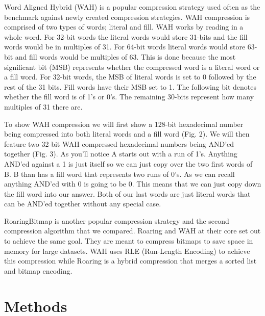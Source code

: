\documentclass{article}
\begin{document}

Word Aligned Hybrid (WAH) is a popular compression strategy used often as the benchmark against newly created compression strategies. WAH compression is comprised of two types of words; literal and fill. WAH works by reading in a whole word. For 32-bit words the literal words would store 31-bits and the fill words would be in multiples of 31. For 64-bit words literal words would store 63-bit and fill words would be multiples of 63. This is done because the most significant bit (MSB) represents whether the compressed word is a literal word or a fill word. For 32-bit words, the MSB of literal words is set to 0 followed by the rest of the 31 bits. Fill words have their MSB set to 1. The following bit denotes whether the fill word is of 1’s or 0’s. The remaining 30-bits represent how many multiples of 31 there are. \par

To show WAH compression we will first show a 128-bit hexadecimal number being compressed into both literal words and a fill word (Fig. 2). We will then feature two 32-bit WAH compressed hexadecimal numbers being AND’ed together (Fig. 3). As you’ll notice A starts out with a run of 1’s. Anything AND’ed against a 1 is just itself so we can just copy over the two first words of B. B than has a fill word that represents two runs of 0’s. As we can recall anything AND’ed with 0 is going to be 0. This means that we can just copy down the fill word into our answer. Both of our last words are just literal words that can be AND’ed together without any special case. \par



RoaringBitmap is another popular compression strategy and the second compression algorithm that we compared. Roaring and WAH at their core set out to achieve the same goal. They are meant to compress bitmaps to save space in memory for large datasets. WAH uses RLE (Run-Length Encoding) to achieve this compression while Roaring is a hybrid compression that merges a sorted list and bitmap encoding. \par

%
%
\section{Methods}
\justify
\end{document}
